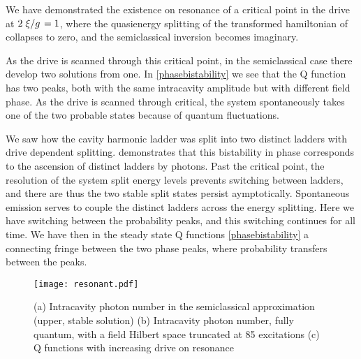 We have demonstrated \cite{Carmichael2015} the existence on resonance of a critical point in the drive at $2\flatfrac{\xi}{g}=1$, where the quasienergy splitting of the transformed hamiltonian of \cite{Alsing1992} collapses to zero, and the semiclassical inversion becomes imaginary. 

As the drive is scanned through this critical point, in the semiclassical case there develop two solutions from one.
In \cref{phasebistability} we see that the Q function has two peaks, both with the same intracavity amplitude but with different field phase. 
As the drive is scanned through critical, the system spontaneously takes one of the two probable states because of quantum fluctuations. 

We saw how the cavity harmonic ladder was split into two distinct ladders with drive dependent splitting. 
\cite{Carmichael2015} demonstrates that this bistability in phase corresponds to the ascension of distinct ladders by photons. 
Past the critical point, the resolution of the system split energy levels prevents switching between ladders, and there are thus the two stable split states persist aymptotically. 
Spontaneous emission serves to couple the distinct ladders across the energy splitting. 
Here we have switching between the probability peaks, and this switching continues for all time. 
We have then in the steady state Q functions \cref{phasebistability} a connecting fringe between the two phase peaks, where probability transfers between the peaks. 
\begin{figure*}[htb]
    \texttt{[image: resonant.pdf]}
    \caption{(a) Intracavity photon number in the semiclassical approximation (upper, stable solution) (b) Intracavity photon number, fully quantum, with a field Hilbert space truncated at 85 excitations (c) Q functions with increasing drive on resonance}
    \label{resonant}
\end{figure*}
